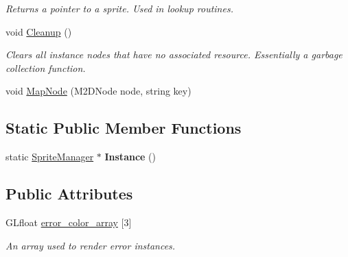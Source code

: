 \begin{DoxyCompactItemize}
\begin{DoxyCompactList}\small\item\em Returns a pointer to a sprite. Used in lookup routines. \item\end{DoxyCompactList}\item 
\hypertarget{classSpriteManager_a1d691cab83ad499119a09c076e107b26}{
void \hyperlink{classSpriteManager_a1d691cab83ad499119a09c076e107b26}{Cleanup} ()}
\label{classSpriteManager_a1d691cab83ad499119a09c076e107b26}

\begin{DoxyCompactList}\small\item\em Clears all instance nodes that have no associated resource. Essentially a garbage collection function. \item\end{DoxyCompactList}\item 
void \hyperlink{classSpriteManager_a34407a9e6ebf2f1eef21050768769d95}{MapNode} (M2DNode node, string key)
\end{DoxyCompactItemize}
\subsection*{Static Public Member Functions}
\begin{DoxyCompactItemize}
\item 
\hypertarget{classSpriteManager_aab85b707923274ebc59acb94f9e04ee2}{
static \hyperlink{classSpriteManager}{SpriteManager} $\ast$ {\bfseries Instance} ()}
\label{classSpriteManager_aab85b707923274ebc59acb94f9e04ee2}

\end{DoxyCompactItemize}
\subsection*{Public Attributes}
\begin{DoxyCompactItemize}
\item 
\hypertarget{classSpriteManager_a991c710279d884da6de3dc7267f484d6}{
GLfloat \hyperlink{classSpriteManager_a991c710279d884da6de3dc7267f484d6}{error\_\-color\_\-array} \mbox{[}3\mbox{]}}
\label{classSpriteManager_a991c710279d884da6de3dc7267f484d6}

\begin{DoxyCompactList}\small\item\em An array used to render error instances. \item\end{DoxyCompactList}\end{DoxyCompactItemize}
